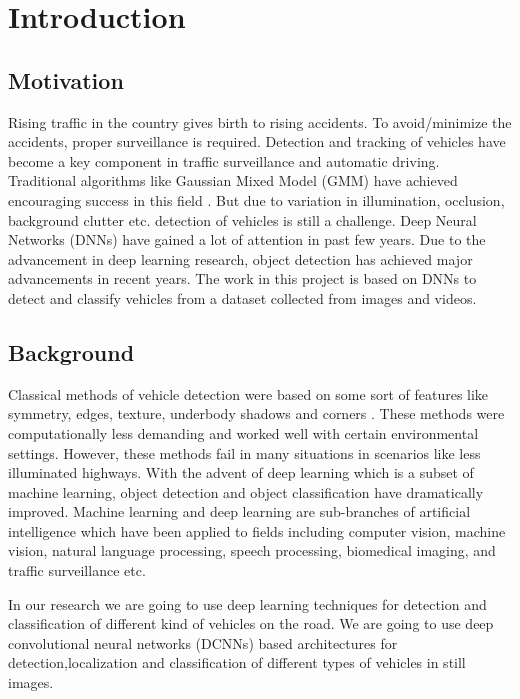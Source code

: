 \chapter{Introduction}
\label{1}
\section{Motivation}

Rising traffic in the country gives birth to rising accidents. To 
avoid/minimize the accidents, proper surveillance is required. Detection 
and tracking of vehicles have become a key component in traffic 
surveillance and automatic driving. Traditional algorithms like Gaussian 
Mixed Model (GMM) have achieved encouraging success in this field \cite{chap_1_article:1}. But due 
to variation in illumination, occlusion, background clutter etc. detection 
of vehicles is still a challenge. 
Deep Neural Networks (DNNs) have gained a lot of attention in 
past few years. Due to the advancement  in deep learning research, object 
detection has achieved major advancements in recent years. The work 
in this project is based on DNNs to detect and classify vehicles from 
a dataset collected from images and videos.

\section{Background}

Classical methods of vehicle detection were based on some 
sort of features like symmetry, edges, texture, underbody shadows 
and corners \cite{chap_1_article:2}. These methods were computationally less demanding and
worked well with certain environmental settings. However, these methods fail in many situations 
in scenarios like less illuminated highways. With the advent of 
deep learning which is a subset of machine learning, object detection and 
object classification have dramatically improved. Machine learning 
and deep learning are sub-branches of artificial intelligence which  
have been applied to fields including computer vision, machine vision,
natural language processing, speech processing, biomedical imaging,
and traffic surveillance etc. 

In our research we are going to use deep learning techniques for detection
and classification of different kind of vehicles on the road.
We are going to use deep convolutional neural networks (DCNNs)
based architectures for detection,localization and classification of
different types of vehicles in still images.  

